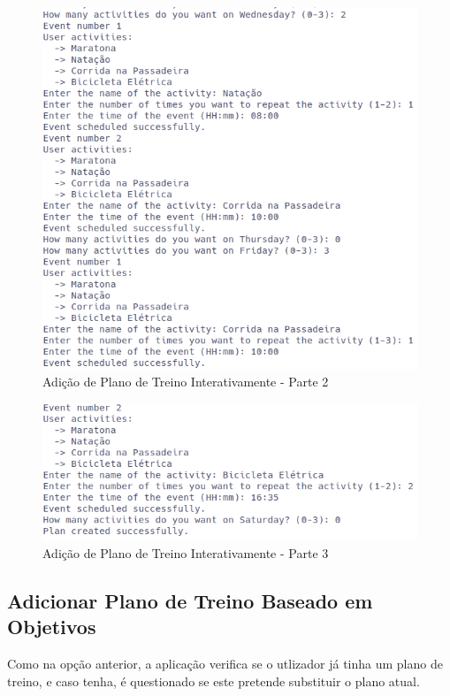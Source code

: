 \documentclass[a4paper,12pt]{scrreprt}
\begin{document}
    \begin{figure}[!ht]
        \centering
        \includegraphics[width=\textwidth]{images/createPlan2.png}
        \caption{Adição de Plano de Treino Interativamente - Parte 2}
        \label{fig:add-plan-2}
    \end{figure}

    \begin{figure}[!ht]
        \centering
        \includegraphics[width=\textwidth]{images/createPlan3.png}
        \caption{Adição de Plano de Treino Interativamente - Parte 3}
        \label{fig:add-plan-3}
    \end{figure}

    \clearpage
    \subsection{Adicionar Plano de Treino Baseado em Objetivos}
    Como na opção anterior, a aplicação verifica se o utlizador já tinha um plano de treino,
    e caso tenha, é questionado se este pretende substituir o plano atual.
\end{document}
